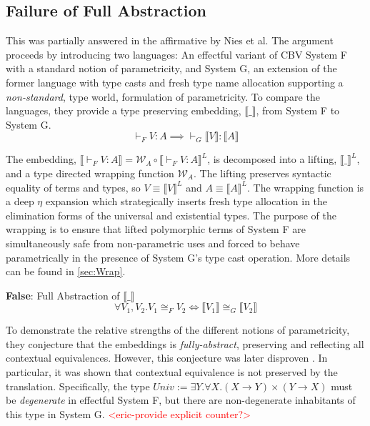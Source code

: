\documentclass[acmsmall]{acmart}
\newcommand{\den}[1]{\llbracket #1\rrbracket}
\newcommand{\eric}[1]{\textcolor{red}{ <eric-#1> }}
\begin{document}
\subsection{Failure of Full Abstraction}
This was partially answered in the affirmative by Nies et al\cite{NonParam}. The argument proceeds by introducing two languages: An effectful variant of CBV System F with a standard notion of parametricity, and System G, an extension of the former language with type casts and fresh type name allocation supporting a \textit{non-standard}, type world, formulation of parametricity.
To compare the languages, they provide a type preserving embedding, $\den{\_}$, from System F to System G. 
  $$\vdash_F V : A \implies \vdash_G \den{V} : \den{A}$$

The embedding, $\den{\vdash_F V:A} = \mathcal{W}_{A} \circ \den{\vdash_F V:A}^L$, is decomposed into a lifting, $\den{\_}^L$, and a type directed wrapping function $\mathcal{W}_A$. The lifting preserves syntactic equality of terms and types, so $V \equiv \den{V}^L$ and $A \equiv \den{A}^L$. The wrapping function is a deep $\eta$ expansion which strategically inserts fresh type allocation in the elimination forms of the universal and existential types. The purpose of the wrapping is to ensure that lifted polymorphic terms of System F are simultaneously safe from non-parametric uses and forced to behave parametrically in the presence of System G's type cast operation. More details can be found in \cref{sec:Wrap}. 

\begin{conjecture}
  \textbf{False}: Full Abstraction of $\den{\_}$
  $$\forall V_1,V_2. V_1\cong_F V_2 \iff \den{V_1} \cong_G \den{V_2}$$
\end{conjecture}

To demonstrate the relative strengths of the different notions of parametricity, they conjecture that the embeddings is \textit{fully-abstract}, preserving and reflecting all contextual equivalences. However, this conjecture was later disproven\cite{ParamVSUniv} \cite{TwoParamVSThreeUniv}. In particular, it was shown that contextual equivalence is not preserved by the translation. Specifically, the type $Univ := \exists Y.\forall X. (X\rightarrow Y)\times (Y \rightarrow X)$ must be \textit{degenerate} in effectful System F, but there are non-degenerate inhabitants of this type in System G. \eric{provide explicit counter?}
\end{document}
